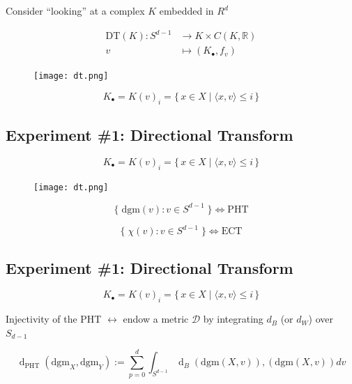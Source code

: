 \documentclass[
  letterpaper,
  DIV=11,
  numbers=noendperiod,
  oneside]{scrartcl}
\begin{document}
Consider ``looking'' at a complex \(K\) embedded in \(R^d\)

\[\begin{align*}
\mathrm{DT}(K): S^{d-1} &\to  K \times C(K, \mathbb{R}) \\
    v &\mapsto (K_\bullet, f_v)
\end{align*}
\]

\begin{figure}

{\centering \texttt{[image: dt.png]}

}

\end{figure}

\[
K_\bullet = K(v)_i = \{\, x \in X \mid \langle x, v \rangle \leq i  \,\}
\]

\hypertarget{experiment-1-directional-transform-1}{%
\subsection{Experiment \#1: Directional
Transform}\label{experiment-1-directional-transform-1}}

\[
K_\bullet = K(v)_i = \{\, x \in X \mid \langle x, v \rangle \leq i  \,\}
\]

\begin{figure}

{\centering \texttt{[image: dt.png]}

}

\end{figure}

\[\{ \; \mathrm{dgm}(v) : v \in S^{d-1} \; \} \Leftrightarrow \mathrm{PHT} \]

\[\{ \; \chi(v) : v \in S^{d-1} \; \} \Leftrightarrow \mathrm{ECT} \]

\hypertarget{experiment-1-directional-transform-2}{%
\subsection{Experiment \#1: Directional
Transform}\label{experiment-1-directional-transform-2}}

\[
K_\bullet = K(v)_i = \{\, x \in X \mid \langle x, v \rangle \leq i  \,\}
\]

Injectivity of the PHT \(\leftrightarrow\) endow a metric
\(\mathcal{D}\) by integrating \(d_B\) (or \(d_W\)) over \(S_{d-1}\)

\[ \operatorname{d}_{\mathrm{PHT}}\left(\mathrm{dgm}_X, \mathrm{dgm}_Y\right):=\sum_{p=0}^d \int_{S^{d-1}} \operatorname{d}_B\left(\mathrm{dgm}(X, v) \right), \left( \mathrm{dgm}(X, v) \right) dv \]
\end{document}
